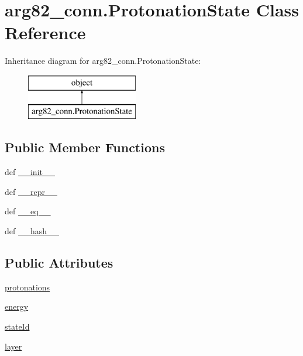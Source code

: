 \hypertarget{classarg82__conn_1_1_protonation_state}{\section{arg82\-\_\-conn.\-Protonation\-State Class Reference}
\label{classarg82__conn_1_1_protonation_state}
}
Inheritance diagram for arg82\-\_\-conn.\-Protonation\-State\-:\begin{figure}[H]
\begin{center}
\leavevmode
\includegraphics[height=2.000000cm]{classarg82__conn_1_1_protonation_state}
\end{center}
\end{figure}
\subsection*{Public Member Functions}
\begin{DoxyCompactItemize}
\item 
def \hyperlink{classarg82__conn_1_1_protonation_state_ae6bde57ba41f798cf046397063f1903c}{\-\_\-\-\_\-init\-\_\-\-\_\-}
\item 
def \hyperlink{classarg82__conn_1_1_protonation_state_a34715b42056818b563a4d8398e950fa4}{\-\_\-\-\_\-repr\-\_\-\-\_\-}
\item 
def \hyperlink{classarg82__conn_1_1_protonation_state_a82dadbad4de0f1f6e4b13b4ec00c6c6e}{\-\_\-\-\_\-eq\-\_\-\-\_\-}
\item 
def \hyperlink{classarg82__conn_1_1_protonation_state_a3dfdfe6af13d5d57939be5413c4247c7}{\-\_\-\-\_\-hash\-\_\-\-\_\-}
\end{DoxyCompactItemize}
\subsection*{Public Attributes}
\begin{DoxyCompactItemize}
\item 
\hyperlink{classarg82__conn_1_1_protonation_state_ae9ee5511457bf1df71f1ecf93aaa6459}{protonations}
\item 
\hyperlink{classarg82__conn_1_1_protonation_state_a9bf4fa947b0c3793b6fe44bc30136974}{energy}
\item 
\hyperlink{classarg82__conn_1_1_protonation_state_aaa69f1fdb8173e169d4d70c5246bfece}{state\-Id}
\item 
\hyperlink{classarg82__conn_1_1_protonation_state_acbb66e3f1da7f2347251a2515de60c23}{layer}
\end{DoxyCompactItemize}

